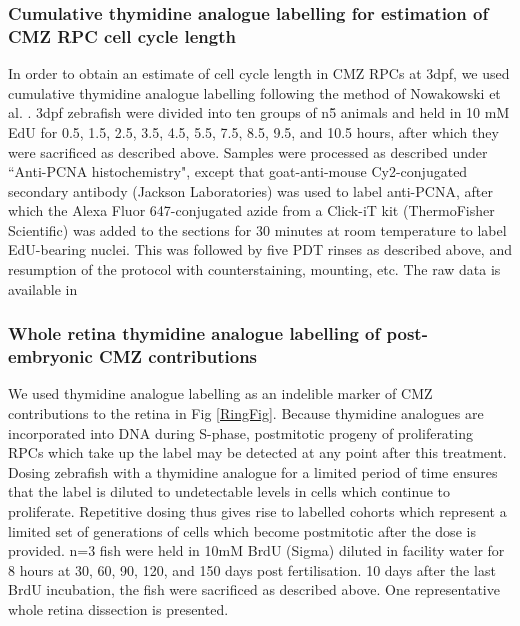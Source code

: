 \documentclass{ut-thesis}
\begin{document}
\begin{NoHyper}
\subsubsection{Cumulative thymidine analogue labelling for estimation of CMZ RPC cell cycle length}
\label{ssec:SMMEcumedu}
In order to obtain an estimate of cell cycle length in CMZ RPCs at 3dpf, we used cumulative thymidine analogue labelling following the method of Nowakowski et al. \cite{Nowakowski1989}. 3dpf zebrafish were divided into ten groups of n\=5 animals and held in 10 mM EdU for 0.5, 1.5, 2.5, 3.5, 4.5, 5.5, 7.5, 8.5, 9.5, and 10.5 hours, after which they were sacrificed as described above. Samples were processed as described under ``Anti-PCNA histochemistry", except that goat-anti-mouse Cy2-conjugated secondary antibody (Jackson Laboratories) was used to label anti-PCNA, after which the Alexa Fluor 647-conjugated azide from a Click-iT kit (ThermoFisher Scientific) was added to the sections for 30 minutes at room temperature to label EdU-bearing nuclei. This was followed by five PDT rinses as described above, and resumption of the protocol with counterstaining, mounting, etc. The raw data is available in 

\subsubsection{Whole retina thymidine analogue labelling of post-embryonic CMZ contributions}
\label{ssec:SMMEwholeretina}
We used thymidine analogue labelling as an indelible marker of CMZ contributions to the retina in Fig \ref{RingFig}. Because thymidine analogues are incorporated into DNA during S-phase, postmitotic progeny of proliferating RPCs which take up the label may be detected at any point after this treatment. Dosing zebrafish with a thymidine analogue for a limited period of time ensures that the label is diluted to undetectable levels in cells which continue to proliferate. Repetitive dosing thus gives rise to labelled cohorts which represent a limited set of generations of cells which become postmitotic after the dose is provided. n=3 fish were held in 10mM BrdU (Sigma) diluted in facility water for 8 hours at 30, 60, 90, 120, and 150 days post fertilisation. 10 days after the last BrdU incubation, the fish were sacrificed as described above. One representative whole retina dissection is presented.


\end{NoHyper}
\end{document}
